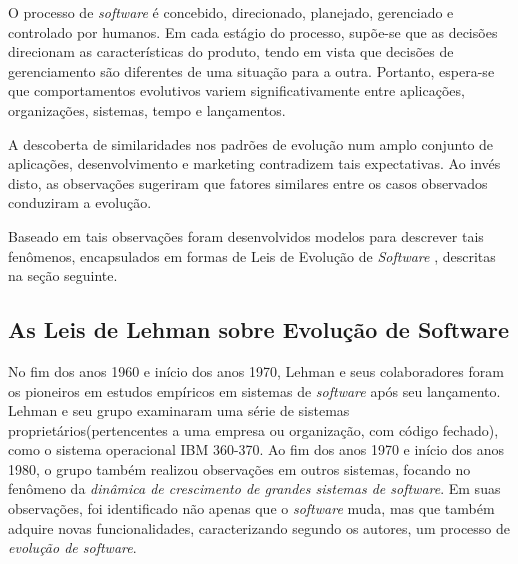 O processo de \textit{software} é concebido, direcionado, planejado, gerenciado e controlado por humanos. Em cada estágio do processo, supõe-se que as decisões direcionam as características do produto, tendo em vista que decisões de gerenciamento são diferentes de uma situação para a outra. Portanto, espera-se que comportamentos evolutivos variem significativamente entre aplicações, organizações, sistemas, tempo e lançamentos.

A descoberta de similaridades nos padrões de evolução num amplo conjunto de aplicações, desenvolvimento e marketing contradizem tais expectativas. Ao invés disto, as observações sugeriram que fatores similares entre os casos observados conduziram a evolução. 
 
Baseado em tais observações foram desenvolvidos modelos para descrever tais fenômenos, encapsulados em formas de Leis de Evolução de \textit{Software} \cite{lehman1985program}, descritas na seção seguinte.
\subsection{As Leis de Lehman sobre Evolução de Software} \label{sec:lehmalaws}


No fim dos anos 1960 e início dos anos 1970, Lehman e seus colaboradores foram os pioneiros em estudos empíricos em sistemas de \textit{software} após seu lançamento. Lehman e seu grupo examinaram uma série de sistemas proprietários(pertencentes a uma empresa ou organização, com código fechado), como o sistema operacional IBM 360-370. Ao fim dos anos 1970 e início dos anos 1980, o grupo também realizou observações em outros sistemas, focando no fenômeno da \textit{dinâmica de crescimento de grandes sistemas de \textit{software}}. Em suas observações, foi identificado não apenas que o \textit{software} muda, mas que também adquire novas funcionalidades, caracterizando segundo os autores, um processo de \textit{evolução de software}.

